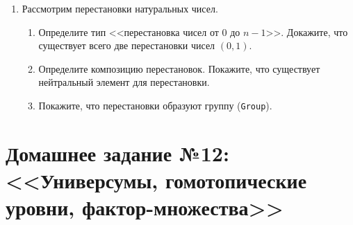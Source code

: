 \documentclass[10pt,a4paper,oneside]{article}
\begin{document}
\begin{enumerate}
\begin{enumerate}
\end{enumerate}
\item Рассмотрим перестановки натуральных чисел.
\begin{enumerate}
\item Определите тип <<перестановка чисел от $0$ до $n-1$>>. Докажите, что существует всего две перестановки чисел $(0,1)$.
\item Определите композицию перестановок. Покажите, что существует нейтральный элемент для перестановки.
\item Покажите, что перестановки образуют группу (\verb!Group!).
\end{enumerate}
\end{enumerate}

\section*{Домашнее задание №12: <<Универсумы, гомотопические уровни, фак\-тор-множества>>}
\end{document}
